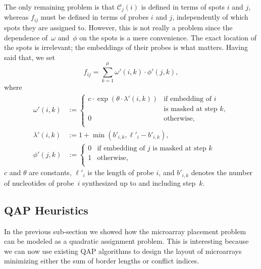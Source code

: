 \documentclass{bioinfo}
\begin{document}
The only remaining problem is that $\mathcal{C}_j(i)$ is defined in terms of spots $i$ and $j$, whereas $f_{ij}$ must be defined in terms of probes $i$ and $j$, independently of which spots they are assigned to. However, this is not really a problem since the dependence of~$\omega$ and~$\phi$ on the spots is a mere convenience. The exact location of the spots is irrelevant; the embeddings of their probes is what matters. Having said that, we set
\begin{equation}
f_{ij} = \sum_{k=1}^{\mu} \omega'(i,k) \cdot \phi'(j,k),
\end{equation}
where
\begin{align}
\omega'(i,k) &:=
        \left\{
                \begin{array}{ll}
                        c \cdot \exp{\left(\theta \cdot \lambda'(i,k)\right)} &
                            \mbox{if embedding of $i$} \\
                          & \mbox{is masked at step $k$}, \\
                        0 & \mbox{otherwise}, \\
                \end{array}
        \right. \\
\lambda'(i,k) &:= 1 + \min(b'_{i,k},\ell'_{i} - b'_{i,k}), \\
\phi'(j,k) &:=
        \left\{
                \begin{array}{ll}
                        0 & \mbox{if embedding of $j$ is masked at step $k$} \\
                        1 & \mbox{otherwise}, \\
                \end{array}
        \right.
\end{align}
$c$ and $\theta$ are constants, $\ell'_i$ is the length of probe $i$, and $b'_{i,k}$ denotes the number of nucleotides of probe~$i$ synthesized up to and including step~$k$.

\subsection{QAP Heuristics}

In the previous sub-section we showed how the microarray placement problem can be modeled as a quadratic assignment problem. This is interesting because we can now use existing QAP algorithms to design the layout of microarrays minimizing either the sum of border lengths or conflict indices. 
\end{document}
